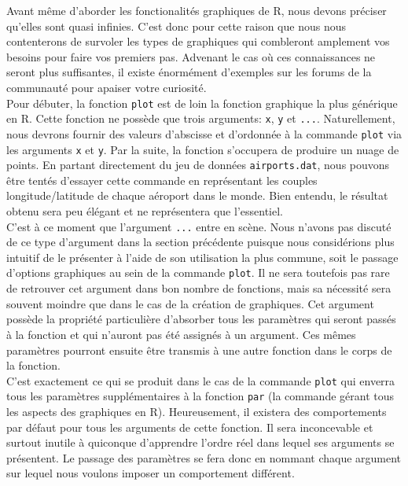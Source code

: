 Avant même d'aborder les fonctionalités graphiques de R, nous devons préciser qu'elles sont quasi infinies. C'est donc pour cette raison que nous nous contenterons de survoler les types de graphiques qui combleront amplement vos besoins pour faire vos premiers pas. Advenant le cas où ces connaissances ne seront plus suffisantes, il existe énormément d'exemples sur les forums de la communauté pour apaiser votre curiosité. \\

Pour débuter, la fonction \texttt{plot} \cite{Rfunction:plot} est de loin la fonction graphique la plus générique en R. Cette fonction ne possède que trois arguments: \texttt{x}, \texttt{y} et \texttt{...}. Naturellement, nous devrons fournir des valeurs d'abscisse et d'ordonnée à la commande \texttt{plot} via les arguments \texttt{x} et \texttt{y}. Par la suite, la fonction s'occupera de produire un nuage de points. En partant directement du jeu de données \texttt{airports.dat}, nous pouvons être tentés d'essayer cette commande en représentant les couples longitude/latitude de chaque aéroport dans le monde. Bien entendu, le résultat obtenu sera peu élégant et ne représentera que l'essentiel. \\

C'est à ce moment que l'argument \texttt{...} entre en scène. Nous n'avons pas discuté de ce type d'argument dans la section précédente puisque nous considérions plus intuitif de le présenter à l'aide de son utilisation la plus commune, soit le passage d'options graphiques au sein de la commande \texttt{plot}. Il ne sera toutefois pas rare de retrouver cet argument dans bon nombre de fonctions, mais sa nécessité sera souvent moindre que dans le cas de la création de graphiques. Cet argument possède la propriété particulière d'absorber tous les paramètres qui seront passés à la fonction et qui n'auront pas été assignés à un argument. Ces mêmes paramètres pourront ensuite être transmis à une autre fonction dans le corps de la fonction. \\

C'est exactement ce qui se produit dans le cas de la commande \texttt{plot} qui enverra tous les paramètres supplémentaires à la fonction \texttt{par} \cite{Rfunction:par} (la commande gérant tous les aspects des graphiques en R). Heureusement, il existera des comportements par défaut pour tous les arguments de cette fonction. Il sera inconcevable et surtout inutile à quiconque d'apprendre l'ordre réel dans lequel ses arguments se présentent. Le passage des paramètres se fera donc en nommant chaque argument sur lequel nous voulons imposer un comportement différent. \\


